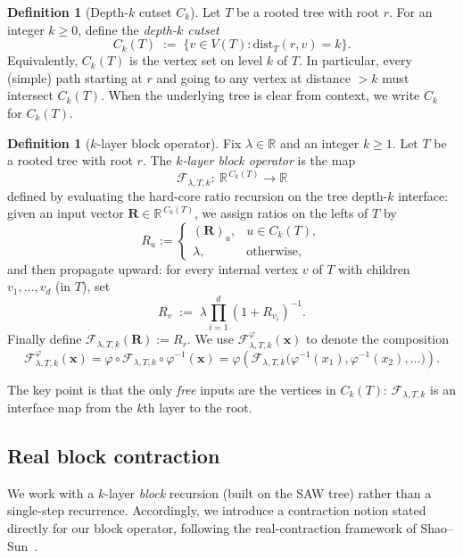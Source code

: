 \documentclass[a4paper,11pt]{article}
\theoremstyle{plain}
\theoremstyle{definition}
\newtheorem{definition}[theorem]{Definition}
\theoremstyle{remark}
\newcommand{\1}{\mathbf{1}}
\newcommand{\R}{\mathbb{R}}
\begin{document}
\begin{definition}[Depth-$k$ cutset $C_k$]\label{def:cutset_Ck}
Let $T$ be a rooted tree with root $r$. For an integer $k\ge 0$, define the \emph{depth-$k$ cutset}
\[
C_k(T) \;:=\;\{v\in V(T): \mathrm{dist}_T(r,v)=k\}.
\]
Equivalently, $C_k(T)$ is the vertex set on level $k$ of $T$.
In particular, every (simple) path starting at $r$ and going to any vertex at distance $>k$ must intersect $C_k(T)$.
When the underlying tree is clear from context, we write $C_k$ for $C_k(T)$.
\end{definition}



\begin{definition}[$k$-layer block operator]\label{def:block_function}
Fix $\lambda \in \R$ and an integer $k\ge 1$. Let $T$ be a rooted tree with root $r$.
The \emph{$k$-layer block operator} is the map
\[
\mathcal{F}_{\lambda,T,k}:\ {\R}^{\,C_k(T)}\to {\R}
\]
defined by evaluating the hard-core ratio recursion on the tree depth-$k$
interface: given an input vector $\mathbf{R}\in{\R}^{\,C_k(T)}$, we assign ratios on the lefts of $T$ by
\[
R_u :=
\begin{cases}
(\mathbf{R})_u, & u\in C_k(T),\\
\lambda, & \text{otherwise},
\end{cases}
\]
and then propagate upward: for every internal vertex $v$ of $T$ with children $v_1,\dots,v_d$ (in $T$), set
\[
R_v \;:=\; \lambda\prod_{i=1}^{d}(1+R_{v_i})^{-1}.
\]
Finally define $\mathcal{F}_{\lambda,T,k}(\mathbf{R}):=R_r$.
We use $\mathcal{F}_{\lambda,T,k}^\varphi(\mathbf{x})$ to denote the composition
\[
\mathcal{F}_{\lambda,T,k}^\varphi(\mathbf{x})
=
\varphi \circ \mathcal{F}_{\lambda,T,k} \circ \varphi^{-1}(\mathbf{x})
=
\varphi\!\left(
\mathcal{F}_{\lambda,T,k}\bigl(\varphi^{-1}(x_1), \varphi^{-1}(x_2), \dots\bigr)
\right).
\]

The key point is that the only \emph{free} inputs are the vertices in $C_k(T)$: $\mathcal{F}_{\lambda,T,k}$ is an interface map
from the $k$th layer to the root.


\end{definition}



\subsection{Real block contraction}\label{subsec:block_contraction}


We work with a $k$-layer \emph{block} recursion (built on the SAW tree) rather than a single-step recurrence.
Accordingly, we introduce a contraction notion stated directly for our block operator, following the real-contraction
framework of Shao--Sun~\cite{shao2021contraction}.
\end{document}
